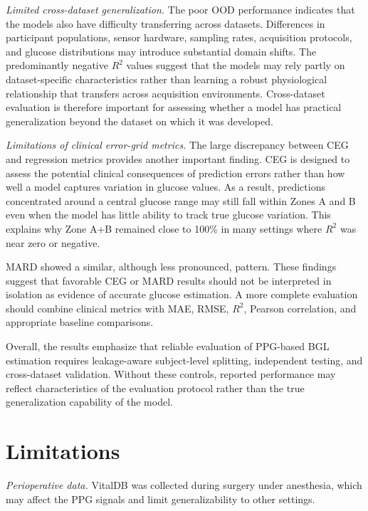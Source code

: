 \documentclass{article}
\begin{document}
\textit{Limited cross-dataset generalization.}
The poor OOD performance indicates that the models also have difficulty transferring across datasets. Differences in participant populations, sensor hardware, sampling rates, acquisition protocols, and glucose distributions may introduce substantial domain shifts. The predominantly negative $R^2$ values suggest that the models may rely partly on dataset-specific characteristics rather than learning a robust physiological relationship that transfers across acquisition environments. Cross-dataset evaluation is therefore important for assessing whether a model has practical generalization beyond the dataset on which it was developed.

\textit{Limitations of clinical error-grid metrics.}
The large discrepancy between CEG and regression metrics provides another important finding. CEG is designed to assess the potential clinical consequences of prediction errors rather than how well a model captures variation in glucose values. As a result, predictions concentrated around a central glucose range may still fall within Zones A and B even when the model has little ability to track true glucose variation. This explains why Zone A+B remained close to 100\% in many settings where $R^2$ was near zero or negative.

MARD showed a similar, although less pronounced, pattern. These findings suggest that favorable CEG or MARD results should not be interpreted in isolation as evidence of accurate glucose estimation. A more complete evaluation should combine clinical metrics with MAE, RMSE, $R^2$, Pearson correlation, and appropriate baseline comparisons.

Overall, the results emphasize that reliable evaluation of PPG-based BGL estimation requires leakage-aware subject-level splitting, independent testing, and cross-dataset validation. Without these controls, reported performance may reflect characteristics of the evaluation protocol rather than the true generalization capability of the model.







\section{Limitations}

\textit{Perioperative data.}
VitalDB was collected during surgery under anesthesia, which may affect the PPG signals and limit generalizability to other settings.
\end{document}

